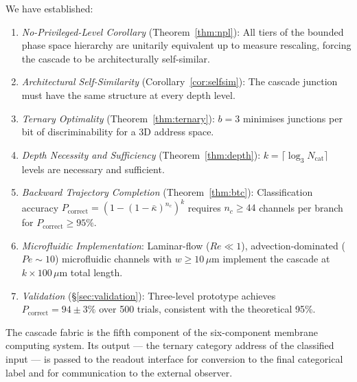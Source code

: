 \documentclass[11pt,twocolumn,a4paper]{article}
\theoremstyle{remark}
\newcommand{\kap}{\kappa}
\begin{document}
We have established:

\begin{enumerate}[nosep]
\item \textit{No-Privileged-Level Corollary} (Theorem~\ref{thm:npl}):
  All tiers of the bounded phase space hierarchy are unitarily equivalent
  up to measure rescaling, forcing the cascade to be architecturally self-similar.
\item \textit{Architectural Self-Similarity} (Corollary~\ref{cor:selfsim}):
  The cascade junction must have the same structure at every depth level.
\item \textit{Ternary Optimality} (Theorem~\ref{thm:ternary}):
  $b = 3$ minimises junctions per bit of discriminability for a 3D address space.
\item \textit{Depth Necessity and Sufficiency} (Theorem~\ref{thm:depth}):
  $k = \lceil\log_3 N_{\mathrm{cat}}\rceil$ levels are necessary and sufficient.
\item \textit{Backward Trajectory Completion} (Theorem~\ref{thm:btc}):
  Classification accuracy $P_{\mathrm{correct}} = (1-(1-\bar{\kap})^{n_c})^k$
  requires $n_c \geq 44$ channels per branch for $P_{\mathrm{correct}} \geq 95\%$.
\item \textit{Microfluidic Implementation}: Laminar-flow ($Re \ll 1$),
  advection-dominated ($Pe \sim 10$) microfluidic channels with $w \geq 10\,\mu$m
  implement the cascade at $k \times 100\,\mu$m total length.
\item \textit{Validation} (\S\ref{sec:validation}): Three-level prototype
  achieves $P_{\mathrm{correct}} = 94 \pm 3\%$ over 500 trials, consistent
  with the theoretical 95\%.
\end{enumerate}

The cascade fabric is the fifth component of the six-component membrane computing
system. Its output --- the ternary category address of the classified input --- is
passed to the readout interface \citep{companion6} for conversion to the final
categorical label and for communication to the external observer.



\end{document}
